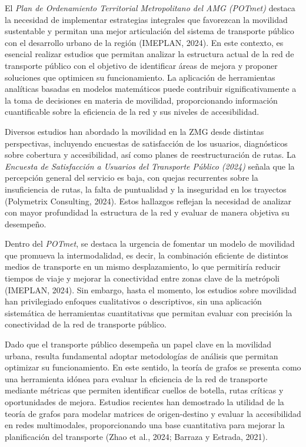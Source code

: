 \documentclass[openany]{book}
\begin{document}
El \textit{Plan de Ordenamiento Territorial Metropolitano del AMG (POTmet)} destaca la necesidad de implementar estrategias integrales que favorezcan la movilidad sustentable y permitan una mejor articulación del sistema de transporte público con el desarrollo urbano de la región (IMEPLAN, 2024). En este contexto, es esencial realizar estudios que permitan analizar la estructura actual de la red de transporte público con el objetivo de identificar áreas de mejora y proponer soluciones que optimicen su funcionamiento. La aplicación de herramientas analíticas basadas en modelos matemáticos puede contribuir significativamente a la toma de decisiones en materia de movilidad, proporcionando información cuantificable sobre la eficiencia de la red y sus niveles de accesibilidad.

Diversos estudios han abordado la movilidad en la ZMG desde distintas perspectivas, incluyendo encuestas de satisfacción de los usuarios, diagnósticos sobre cobertura y accesibilidad, así como planes de reestructuración de rutas. La \textit{Encuesta de Satisfacción a Usuarios del Transporte Público (2024)} señala que la percepción general del servicio es baja, con quejas recurrentes sobre la insuficiencia de rutas, la falta de puntualidad y la inseguridad en los trayectos (Polymetrix Consulting, 2024). Estos hallazgos reflejan la necesidad de analizar con mayor profundidad la estructura de la red y evaluar de manera objetiva su desempeño.

Dentro del \textit{POTmet}, se destaca la urgencia de fomentar un modelo de movilidad que promueva la intermodalidad, es decir, la combinación eficiente de distintos medios de transporte en un mismo desplazamiento, lo que permitiría reducir tiempos de viaje y mejorar la conectividad entre zonas clave de la metrópoli (IMEPLAN, 2024). Sin embargo, hasta el momento, los estudios sobre movilidad han privilegiado enfoques cualitativos o descriptivos, sin una aplicación sistemática de herramientas cuantitativas que permitan evaluar con precisión la conectividad de la red de transporte público.

Dado que el transporte público desempeña un papel clave en la movilidad urbana, resulta fundamental adoptar metodologías de análisis que permitan optimizar su funcionamiento. En este sentido, la teoría de grafos se presenta como una herramienta idónea para evaluar la eficiencia de la red de transporte mediante métricas que permiten identificar cuellos de botella, rutas críticas y oportunidades de mejora. Estudios recientes han demostrado la utilidad de la teoría de grafos para modelar matrices de origen-destino y evaluar la accesibilidad en redes multimodales, proporcionando una base cuantitativa para mejorar la planificación del transporte (Zhao et al., 2024; Barraza y Estrada, 2021).
\end{document}
